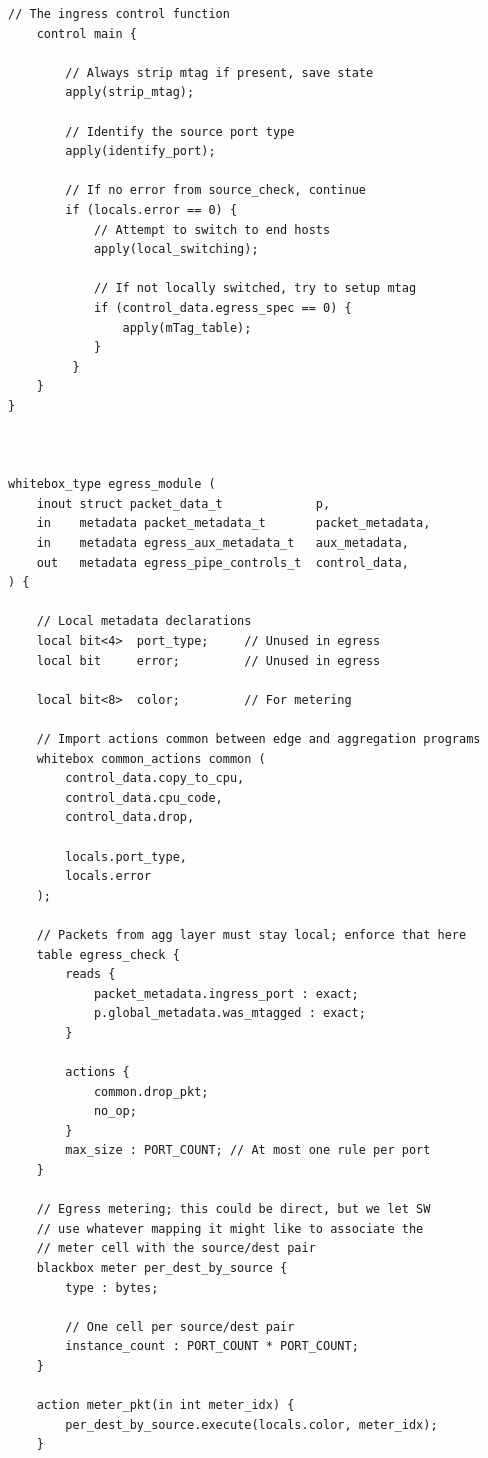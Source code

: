 \documentclass[12pt]{article}
\begin{document}
\begin{lstlisting}[style=P4style]
    // The ingress control function
    control main {

        // Always strip mtag if present, save state
        apply(strip_mtag);

        // Identify the source port type
        apply(identify_port);

        // If no error from source_check, continue
        if (locals.error == 0) {
            // Attempt to switch to end hosts
            apply(local_switching);

            // If not locally switched, try to setup mtag
            if (control_data.egress_spec == 0) {
                apply(mTag_table);
            }
         }
    }
}



whitebox_type egress_module (
    inout struct packet_data_t             p,
    in    metadata packet_metadata_t       packet_metadata,
    in    metadata egress_aux_metadata_t   aux_metadata,
    out   metadata egress_pipe_controls_t  control_data,
) {

    // Local metadata declarations
    local bit<4>  port_type;     // Unused in egress
    local bit     error;         // Unused in egress

    local bit<8>  color;         // For metering

    // Import actions common between edge and aggregation programs
    whitebox common_actions common (
        control_data.copy_to_cpu,
        control_data.cpu_code,
        control_data.drop,

        locals.port_type,
        locals.error
    );

    // Packets from agg layer must stay local; enforce that here
    table egress_check {
        reads {
            packet_metadata.ingress_port : exact;
            p.global_metadata.was_mtagged : exact;
        }

        actions {    
            common.drop_pkt;
            no_op;
        }
        max_size : PORT_COUNT; // At most one rule per port
    }

    // Egress metering; this could be direct, but we let SW 
    // use whatever mapping it might like to associate the
    // meter cell with the source/dest pair
    blackbox meter per_dest_by_source {
        type : bytes;

        // One cell per source/dest pair
        instance_count : PORT_COUNT * PORT_COUNT; 
    }

    action meter_pkt(in int meter_idx) {
        per_dest_by_source.execute(locals.color, meter_idx);
    }


\end{lstlisting}
\end{document}
